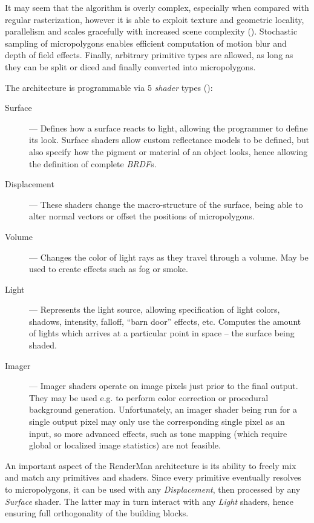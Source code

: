 It may seem that the algorithm is overly complex, especially when compared with regular rasterization, however it is able to exploit texture and geometric locality, parallelism and scales gracefully with increased scene complexity (\cite{Cook87reyes}). Stochastic sampling of micropolygons enables efficient computation of motion blur and depth of field effects. Finally, arbitrary primitive types are allowed, as long as they can be split or diced and finally converted into micropolygons.

The architecture is programmable via 5 \emph{shader} types (\cite{keyframeRSL1}):

\begin{description}
\item[Surface] --- Defines how a surface reacts to light, allowing the programmer to define its look. Surface shaders allow custom reflectance models to be defined, but also specify how the pigment or material of an object looks, hence allowing the definition of complete \emph{BRDF}s.
\item[Displacement] --- These shaders change the macro-structure of the surface, being able to alter normal vectors or offset the positions of micropolygons.
\item[Volume] --- Changes the color of light rays as they travel through a volume. May be used to create effects such as fog or smoke.
\item[Light] --- Represents the light source, allowing specification of light colors, shadows, intensity, falloff, ``barn door'' effects, etc. Computes the amount of lights which arrives at a particular point in space -- the surface being shaded.
\item[Imager] --- Imager shaders operate on image pixels just prior to the final output. They may be used e.g. to perform color correction or procedural background generation. Unfortunately, an imager shader being run for a single output pixel may only use the corresponding single pixel as an input, so more advanced effects, such as tone mapping (which require global or localized image statistics) are not feasible.
\end{description}

An important aspect of the RenderMan architecture is its ability to freely mix and match any primitives and shaders. Since every primitive eventually resolves to micropolygons, it can be used with any \emph{Displacement}, then processed by any \emph{Surface} shader. The latter may in turn interact with any \emph{Light} shaders, hence ensuring full orthogonality of the building blocks.

